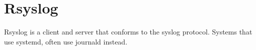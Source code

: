 \section{Rsyslog}

Rsyslog is a client and server that conforms to the syslog protocol.
Systems that use systemd, often use journald instead.


